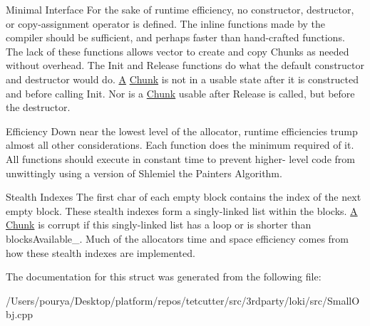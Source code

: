 \begin{DoxyParagraph}{Minimal Interface}
For the sake of runtime efficiency, no constructor, destructor, or copy-\/assignment operator is defined. The inline functions made by the compiler should be sufficient, and perhaps faster than hand-\/crafted functions. The lack of these functions allows vector to create and copy Chunks as needed without overhead. The Init and Release functions do what the default constructor and destructor would do. \hyperlink{structA}{A} \hyperlink{classLoki_1_1Chunk}{Chunk} is not in a usable state after it is constructed and before calling Init. Nor is a \hyperlink{classLoki_1_1Chunk}{Chunk} usable after Release is called, but before the destructor.
\end{DoxyParagraph}
\begin{DoxyParagraph}{Efficiency}
Down near the lowest level of the allocator, runtime efficiencies trump almost all other considerations. Each function does the minimum required of it. All functions should execute in constant time to prevent higher-\/ level code from unwittingly using a version of Shlemiel the Painter\textquotesingle{}s Algorithm.
\end{DoxyParagraph}
\begin{DoxyParagraph}{Stealth Indexes}
The first char of each empty block contains the index of the next empty block. These stealth indexes form a singly-\/linked list within the blocks. \hyperlink{structA}{A} \hyperlink{classLoki_1_1Chunk}{Chunk} is corrupt if this singly-\/linked list has a loop or is shorter than blocks\+Available\+\_\+. Much of the allocator\textquotesingle{}s time and space efficiency comes from how these stealth indexes are implemented. 
\end{DoxyParagraph}


The documentation for this struct was generated from the following file\+:\begin{DoxyCompactItemize}
\item 
/\+Users/pourya/\+Desktop/platform/repos/tetcutter/src/3rdparty/loki/src/Small\+Obj.\+cpp\end{DoxyCompactItemize}
